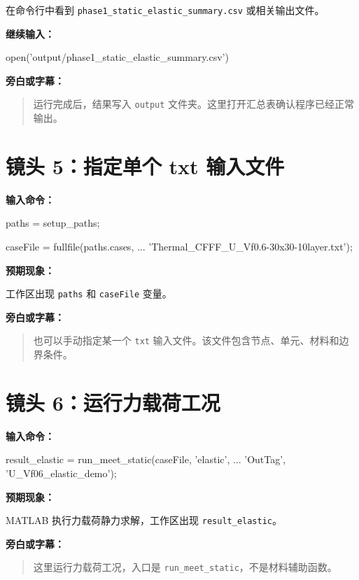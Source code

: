 \documentclass[UTF8,fontset=windows]{ctexart}
\begin{document}
在命令行中看到 \texttt{phase1\_static\_elastic\_summary.csv} 或相关输出文件。

\textbf{继续输入：}

\begin{code}
open('output/phase1_static_elastic_summary.csv')
\end{code}

\textbf{旁白或字幕：}

\begin{quote}
运行完成后，结果写入 \texttt{output} 文件夹。这里打开汇总表确认程序已经正常输出。
\end{quote}

\section{镜头 5：指定单个 txt 输入文件}

\textbf{输入命令：}

\begin{code}
paths = setup_paths;

caseFile = fullfile(paths.cases, ...
    'Thermal_CFFF_U_Vf0.6-30x30-10layer.txt');
\end{code}

\textbf{预期现象：}

工作区出现 \texttt{paths} 和 \texttt{caseFile} 变量。

\textbf{旁白或字幕：}

\begin{quote}
也可以手动指定某一个 \texttt{txt} 输入文件。该文件包含节点、单元、材料和边界条件。
\end{quote}

\section{镜头 6：运行力载荷工况}

\textbf{输入命令：}

\begin{code}
result_elastic = run_meet_static(caseFile, 'elastic', ...
    'OutTag', 'U_Vf06_elastic_demo');
\end{code}

\textbf{预期现象：}

MATLAB 执行力载荷静力求解，工作区出现 \texttt{result\_elastic}。

\textbf{旁白或字幕：}

\begin{quote}
这里运行力载荷工况，入口是 \texttt{run\_meet\_static}，不是材料辅助函数。
\end{quote}
\end{document}
